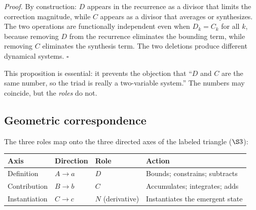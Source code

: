 \documentclass[12pt]{article}
\begin{document}
\emph{Proof.} By construction: \(D\) appears in the recurrence as a
divisor that limits the correction magnitude, while \(C\) appears as a
divisor that averages or synthesizes. The two operations are
functionally independent even when \(D_k = C_k\) for all \(k\), because
removing \(D\) from the recurrence eliminates the bounding term, while
removing \(C\) eliminates the synthesis term. The two deletions produce
different dynamical systems. \(\square\)

This proposition is essential: it prevents the objection that ``\(D\)
and \(C\) are the same number, so the triad is really a two-variable
system.'' The numbers may coincide, but the \emph{roles} do not.

\subsection{Geometric correspondence}\label{geometric-correspondence}

The three roles map onto the three directed axes of the labeled triangle
(\(\S 3\)):

\begin{longtable}[]{@{}
  >{\raggedright\arraybackslash}p{}
  >{\raggedright\arraybackslash}p{}
  >{\raggedright\arraybackslash}p{}
  >{\raggedright\arraybackslash}p{}@{}}
\toprule\noalign{}
\begin{minipage}[b]{\linewidth}\raggedright
Axis
\end{minipage} & \begin{minipage}[b]{\linewidth}\raggedright
Direction
\end{minipage} & \begin{minipage}[b]{\linewidth}\raggedright
Role
\end{minipage} & \begin{minipage}[b]{\linewidth}\raggedright
Action
\end{minipage} \\
\midrule\noalign{}
\endhead
\bottomrule\noalign{}
\endlastfoot
Definition & \(A \to a\) & \(D\) & Bounds; constrains; subtracts \\
Contribution & \(B \to b\) & \(C\) & Accumulates; integrates; adds \\
Instantiation & \(C \to c\) & \(N\) (derivative) & Instantiates the
emergent state \\
\end{longtable}
\end{document}
